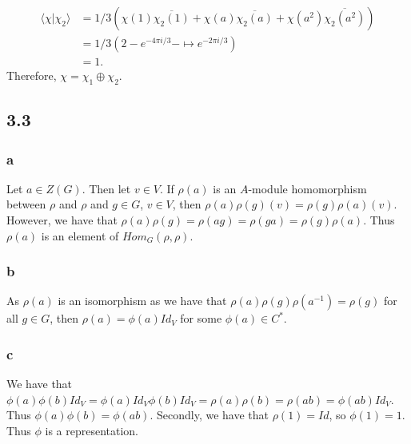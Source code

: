 \documentclass[]{article}
\begin{document}
\begin{align*}
	\langle \chi | \chi_2 \rangle &= 1/3 \left( \chi(1)\overline{\chi_2(1)} +   \chi(a)\overline{\chi_2(a)} + \chi(a^2)\overline{\chi_2(a^2)}   \right) \\
	&= 1/3(2 -e^{-4 \pi i/3} - \mapsto e^{-2 \pi i/3}) \\
	&= 1.
\end{align*}
Therefore, $\chi = \chi_1 \oplus \chi_2$.

\subsection*{3.3}
\subsubsection*{a}
Let $a \in Z(G)$. Then let $v \in V$. If $\rho(a)$ is an $A$-module homomorphism between $\rho$ and $\rho$ and $g \in G$, $v \in V$, then $\rho(a) \rho(g)(v) = \rho(g) \rho(a) (v)$. However, we have that $\rho(a) \rho(g) = \rho(ag) = \rho(ga) = \rho(g) \rho(a)$. Thus $\rho(a)$ is an element of $Hom_G(\rho, \rho)$.

\subsubsection*{b}
As $\rho(a)$ is an isomorphism as we have that $\rho(a) \rho(g) \rho(a^{-1}) = \rho(g)$ for all $g \in G$, then $\rho(a) = \phi(a) Id_V$ for some $\phi(a) \in C^*$. 
\subsubsection*{c}
We have that $\phi(a) \phi(b) Id_V = \phi(a) Id_V \phi(b) Id_V = \rho(a) \rho(b) = \rho(ab) = \phi(ab) Id_V$. Thus $\phi(a) \phi(b) = \phi(ab)$. Secondly, we have that $\rho(1) = Id$, so $\phi(1) = 1$. Thus $\phi$ is a representation. 

\end{document}
